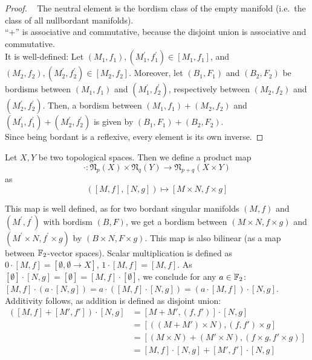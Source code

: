 \documentclass[a4paper,11pt]{article}
\begin{document}
\begin{proof}
    \ \cite{brocker}
    The neutral element is the bordism class of the empty manifold (i.e.\ the class of all nullbordant manifolds).\\
    \enquote{+} is associative and commutative, because the disjoint union is associative and commutative.\\
    It is well-defined:
    Let \((M_1,f_1),(M_1^\prime,f_1^\prime)\in[M_1,f_1]\), and \((M_2,f_2),(M_2^\prime,f_2^\prime)\in[M_2,f_2]\).
    Moreover, let \((B_1,F_1)\) and \((B_2,F_2)\) be bordisms between \((M_1,f_1)\) and \((M_1^\prime,f_2^\prime)\), respectively between \((M_2,f_2)\) and \((M_2^\prime,f_2^\prime)\). Then, a bordism between \((M_1,f_1)+(M_2,f_2)\) and \((M_1^\prime,f_1^\prime)+(M_2^\prime,f_2^\prime)\) is given by \((B_1,F_1)+(B_2,F_2)\).\\
    Since being bordant is a reflexive, every element is its own inverse.
\end{proof}

\begin{definition}
    Let \(X,Y\) be two topological spaces. Then we define a product map
    \[\cdot:\mathfrak{N}_p(X)\times\mathfrak{N}_q(Y)\to\mathfrak{N}_{p+q}(X\times Y)\]
    as
    \[([M,f],[N,g])\mapsto [M\times N,f\times g]\]
\end{definition}

\begin{observation}
    This map is well defined, as for two bordant singular manifolds \((M,f)\) and \((M^\prime,f^\prime)\) with bordism \((B,F)\), we get a bordism between \((M\times N,f\times g)\) and \((M^\prime\times N, f^\prime\times g)\) by \((B\times N, F\times g)\). 
    This map is also bilinear (as a map between \(\mathbb{F}_2\)-vector spaces). Scalar multiplication is defined as \(0\cdot[M,f]=[\emptyset,\emptyset\to X]\), \(1\cdot[M,f]=[M,f]\). As \([\emptyset]\cdot[N,g]=[\emptyset]=[M,f]\cdot[\emptyset]\), we conclude for any \(a\in\mathbb{F}_2\): \([M,f]\cdot(a\cdot[N,g])=a\cdot([M,f]\cdot[N,g])=(a\cdot[M,f])\cdot[N,g]\). Additivity follows, as addition is defined as disjoint union: 
    \begin{align*}
        ([M,f]+[M',f'])\cdot[N,g]&=[M+M',(f,f')]\cdot[N,g]\\
        &=[((M+M')\times N ),(f,f')\times g]\\
        &= [(M\times N) + (M'\times N),(f\times g,f'\times g)]\\
        &=[M,f]\cdot[N,g]+[M',f']\cdot[N,g]\end{align*}
\end{observation}
\end{document}
